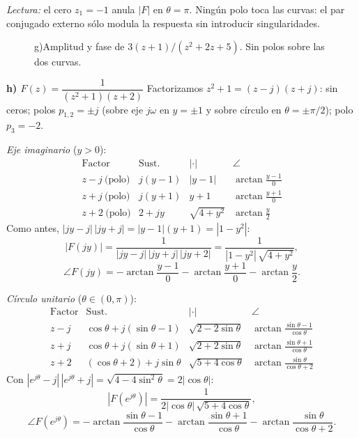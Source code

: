 \documentclass[10pt,a4paper]{article}
\begin{document}
\noindent\textit{Lectura:} el cero $z_1=-1$ anula $|F|$ en $\theta=\pi$. Ningún polo toca las curvas: el par conjugado externo sólo modula la respuesta sin introducir singularidades.

\begin{figure}[H]\centering
	
	\caption{g)\enspace Amplitud y fase de $3(z+1)/(z^2+2z+5)$. Sin polos sobre las dos curvas.}
	\label{fig:resp16g}
\end{figure}

\bigskip

\noindent\textbf{h) $F(z)=\dfrac{1}{(z^2+1)(z+2)}$}\;\textemdash\; Factorizamos $z^2+1=(z-j)(z+j)$: sin ceros; polos $p_{1,2}=\pm j$ (sobre eje $j\omega$ en $y=\pm 1$ y sobre círculo en $\theta=\pm\pi/2$); polo $p_3=-2$.

\medskip
\noindent\textit{Eje imaginario} ($y>0$):
\[
	\renewcommand{\arraystretch}{1.3}
	\begin{array}{l|c|c|c}
	\text{Factor} & \text{Sust.} & |\cdot| & \angle \\\hline
	z-j\ \text{(polo)} & j(y-1) & |y-1|        & \arctan\tfrac{y-1}{0} \\
	z+j\ \text{(polo)} & j(y+1) & y+1          & \arctan\tfrac{y+1}{0} \\
	z+2\ \text{(polo)} & 2+jy   & \sqrt{4+y^2} & \arctan\tfrac{y}{2}
	\end{array}
\]
Como antes, $|jy-j|\,|jy+j|=|y-1|(y+1)=|1-y^2|$:
\[
	|F(jy)| = \frac{1}{|jy-j|\,|jy+j|\,|jy+2|} = \frac{1}{|1-y^2|\,\sqrt{4+y^2}},
\]
\[
	\angle F(jy) = -\arctan\!\frac{y-1}{0} - \arctan\!\frac{y+1}{0} - \arctan\!\frac{y}{2}.
\]

\medskip
\noindent\textit{Círculo unitario} ($\theta\in(0,\pi)$):
\[
	\renewcommand{\arraystretch}{1.3}
	\begin{array}{l|c|c|c}
	\text{Factor} & \text{Sust.} & |\cdot| & \angle \\\hline
	z-j & \cos\theta+j(\sin\theta-1) & \sqrt{2-2\sin\theta} & \arctan\tfrac{\sin\theta-1}{\cos\theta} \\
	z+j & \cos\theta+j(\sin\theta+1) & \sqrt{2+2\sin\theta} & \arctan\tfrac{\sin\theta+1}{\cos\theta} \\
	z+2 & (\cos\theta+2)+j\sin\theta & \sqrt{5+4\cos\theta} & \arctan\tfrac{\sin\theta}{\cos\theta+2}
	\end{array}
\]
Con $|e^{j\theta}-j|\,|e^{j\theta}+j|=\sqrt{4-4\sin^2\theta}=2|\cos\theta|$:
\[
	|F(e^{j\theta})| = \frac{1}{2|\cos\theta|\,\sqrt{5+4\cos\theta}},
\]
\[
	\angle F(e^{j\theta}) = -\arctan\!\frac{\sin\theta-1}{\cos\theta} - \arctan\!\frac{\sin\theta+1}{\cos\theta} - \arctan\!\frac{\sin\theta}{\cos\theta+2}.
\]
\end{document}

